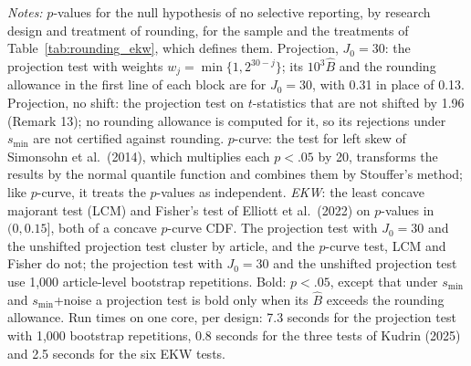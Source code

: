 \begin{table}[htbp]
\medskip
\begin{minipage}{\linewidth}
\footnotesize
\textit{Notes:} $p$-values for the null hypothesis of no selective reporting, by research design and treatment of rounding, for the sample and the treatments of Table~\ref{tab:rounding_ekw}, which defines them.
Projection, $J_0=30$: the projection test with weights $w_j=\min\{1,2^{30-j}\}$; its $10^3\widehat{B}$ and the rounding allowance in the first line of each block are for $J_0=30$, with 0.31 in place of 0.13.
Projection, no shift: the projection test on $t$-statistics that are not shifted by 1.96 (Remark 13); no rounding allowance is computed for it, so its rejections under $s_{\min}$ are not certified against rounding.
$p$-curve: the test for left skew of Simonsohn et al.\ (2014), which multiplies each $p<.05$ by 20, transforms the results by the normal quantile function and combines them by Stouffer's method; like $p$-curve, it treats the $p$-values as independent.
\textit{EKW}: the least concave majorant test (LCM) and Fisher's test of Elliott et al.\ (2022) on $p$-values in $(0,0.15]$, both of a concave $p$-curve CDF.
The projection test with $J_0=30$ and the unshifted projection test cluster by article, and the $p$-curve test, LCM and Fisher do not; the projection test with $J_0=30$ and the unshifted projection test use 1,000 article-level bootstrap repetitions.
Bold: $p<.05$, except that under $s_{\min}$ and $s_{\min}$+noise a projection test is bold only when its $\widehat{B}$ exceeds the rounding allowance.
Run times on one core, per design: 7.3 seconds for the projection test with 1,000 bootstrap repetitions, 0.8 seconds for the three tests of Kudrin (2025) and 2.5 seconds for the six EKW tests.
\end{minipage}
\end{table}
